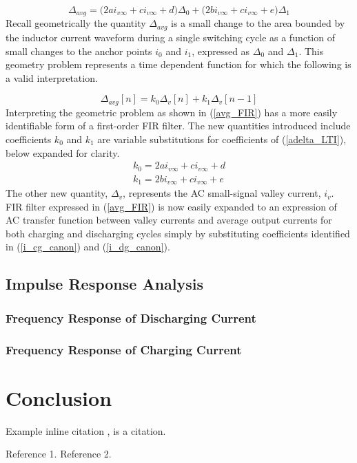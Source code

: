 \documentclass[conference]{IEEEtran}
\begin{document}
\begin{equation}
	\Delta_{avg} = \big ( 2 a i_{v\infty} + c i_{v\infty} + d  \big) \Delta_0 + 
	\big ( 2 b i_{v\infty} + c i_{v\infty} + e  \big) \Delta_1
	\label{adelta_LTI}
\end{equation}
Recall geometrically the quantity $\Delta_{avg}$ is a small change to the area bounded by the inductor current waveform during a single switching cycle as a function of small changes to the anchor points $i_0$ and $i_1$, expressed as $\Delta_0$ and $\Delta_1$. This geometry problem represents a time dependent function for which the following is a valid interpretation.

\begin{equation}
		\Delta_{avg} [n] = k_0 \Delta_v[n] + 
	k_1 \Delta_v [n-1]
	\label{avg_FIR}
\end{equation}
Interpreting the geometric problem as shown in (\ref{avg_FIR}) has a more easily identifiable form of a first-order FIR filter. The new quantities introduced include coefficients $k_0$ and $k_1$ are variable substitutions for coefficients of (\ref{adelta_LTI}), below expanded for clarity.
\begin{align}
	k_0 = 2 a i_{v\infty} + c i_{v\infty} + d \nonumber \\
	k_1 = 2 b i_{v\infty} + c i_{v\infty} + e 
\end{align}
The other new quantity, $\Delta_v$, represents the AC small-signal valley current, $i_v$.  FIR filter expressed in (\ref{avg_FIR}) is now easily expanded to an expression of AC transfer function between valley currents and average output currents for both charging and discharging cycles simply by substituting coefficients identified in (\ref{i_cg_canon}) and (\ref{i_dg_canon}). 

\subsection{Impulse Response Analysis}

\subsubsection{Frequency Response of Discharging Current}

\subsubsection{Frequency Response of Charging Current}

\section{Conclusion}

Example inline citation
\cite{b1}, is a citation.


\begin{thebibliography}{00}
 Reference 1.
 Reference 2.
\end{thebibliography}
\end{document}
